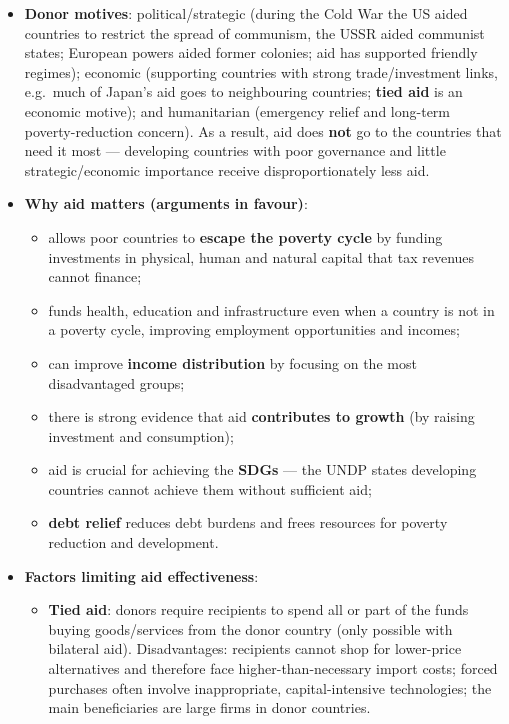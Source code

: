 \documentclass[a4paper,12pt]{article}
\begin{document}
\begin{itemize}
\begin{itemize}
  \end{itemize}
  \item \textbf{Donor motives}: political/strategic (during the Cold War the US aided countries to restrict the spread of communism, the USSR aided communist states; European powers aided former colonies; aid has supported friendly regimes); economic (supporting countries with strong trade/investment links, e.g.\ much of Japan's aid goes to neighbouring countries; \textbf{tied aid} is an economic motive); and humanitarian (emergency relief and long-term poverty-reduction concern). As a result, aid does \textbf{not} go to the countries that need it most --- developing countries with poor governance and little strategic/economic importance receive disproportionately less aid.
  \item \textbf{Why aid matters (arguments in favour)}:
  \begin{itemize}
    \item allows poor countries to \textbf{escape the poverty cycle} by funding investments in physical, human and natural capital that tax revenues cannot finance;
    \item funds health, education and infrastructure even when a country is not in a poverty cycle, improving employment opportunities and incomes;
    \item can improve \textbf{income distribution} by focusing on the most disadvantaged groups;
    \item there is strong evidence that aid \textbf{contributes to growth} (by raising investment and consumption);
    \item aid is crucial for achieving the \textbf{SDGs} --- the UNDP states developing countries cannot achieve them without sufficient aid;
    \item \textbf{debt relief} reduces debt burdens and frees resources for poverty reduction and development.
  \end{itemize}
  \item \textbf{Factors limiting aid effectiveness}:
  \begin{itemize}
    \item \textbf{Tied aid}: donors require recipients to spend all or part of the funds buying goods/services from the donor country (only possible with bilateral aid). Disadvantages: recipients cannot shop for lower-price alternatives and therefore face higher-than-necessary import costs; forced purchases often involve inappropriate, capital-intensive technologies; the main beneficiaries are large firms in donor countries.

\end{itemize}
\end{itemize}
\end{document}
